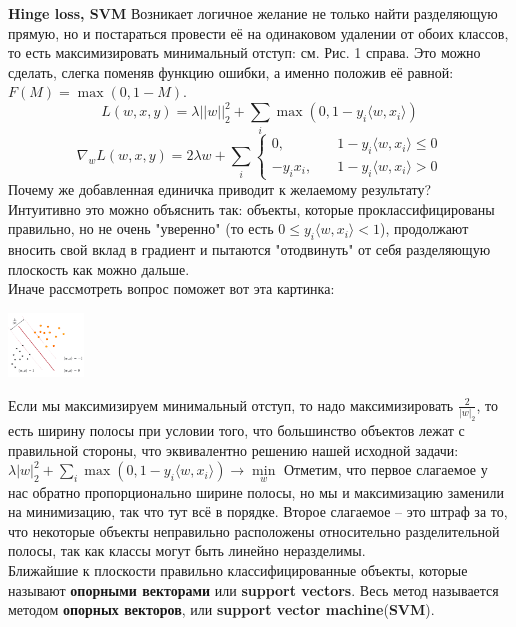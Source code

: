 \textbf{Hinge loss, SVM} Возникает логичное желание не только найти разделяющую прямую, но и постараться провести её на одинаковом удалении от обоих классов, то есть максимизировать минимальный отступ: см. Рис. 1 справа.
Это можно сделать, слегка поменяв функцию ошибки, а именно положив её равной:
$F(M) = \max(0, 1-M)$.
$$L(w, x, y) = \lambda||w||^2_2 + \sum_i \max(0, 1-y_i \langle w, x_i\rangle)$$
$$\nabla_w L(w, x, y) = 2 \lambda w + \sum_i
        \begin{cases} 
             0,      & \quad      1 - y_i \langle w, x_i \rangle \leq 0 \\ 
            - y_i x_i, & \quad   1 - y_i \langle w, x_i \rangle > 0
        \end{cases}$$ 
Почему же добавленная единичка приводит к желаемому результату? \\ Интуитивно это можно объяснить так: объекты, которые проклассифицированы правильно, но не очень "уверенно" (то есть $0 \leq y_i \langle w, x_i\rangle < 1$), продолжают вносить свой вклад в градиент и пытаются "отодвинуть" от себя разделяющую плоскость как можно дальше. \\
Иначе рассмотреть вопрос поможет вот эта картинка:

\includegraphics[width=0.15\textwidth]{pics/t_osn24_5.png}


Если мы максимизируем минимальный отступ, то надо максимизировать $\frac{2}{|w|_2}$, то есть ширину полосы при условии того, что большинство объектов лежат с правильной стороны, что эквивалентно решению нашей исходной задачи:
$\lambda|w|^2_2 + \sum_i \max(0, 1-y_i \langle w, x_i\rangle) \longrightarrow\min\limits_{w}$
Отметим, что первое слагаемое у нас обратно пропорционально ширине полосы, но мы и максимизацию заменили на минимизацию, так что тут всё в порядке. Второе слагаемое – это штраф за то, что некоторые объекты неправильно расположены относительно разделительной полосы, так как классы могут быть линейно неразделимы. \\
Ближайшие к плоскости правильно классифицированные объекты, которые называют \textbf{опорными векторами} или \textbf{support vectors}. Весь метод называется методом \textbf{опорных векторов}, или \textbf{support vector machine}(\textbf{SVM}). 

